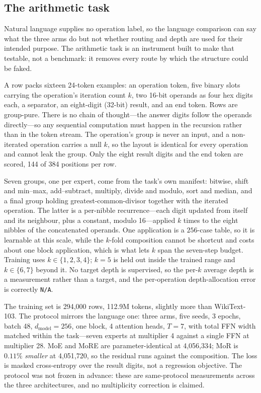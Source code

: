 \subsection{The arithmetic task}
\label{sec:arith-task}

Natural language supplies no operation label, so the language comparison can say
what the three arms do but not whether routing and depth are used for their
intended purpose. The arithmetic task is an instrument built to make that
testable, not a benchmark: it removes every route by which the structure could be
faked.

A row packs sixteen 24-token examples: an operation token, five binary slots
carrying the operation's iteration count $k$, two 16-bit operands as four hex
digits each, a separator, an eight-digit (32-bit) result, and an end token. Rows
are group-pure. There is no chain of thought---the answer digits follow the
operands directly---so any sequential computation must happen in the recursion
rather than in the token stream. The operation's group is never an input, and a
non-iterated operation carries a null $k$, so the layout is identical for every
operation and cannot leak the group. Only the eight result digits and the end
token are scored, 144 of 384 positions per row.

Seven groups, one per expert, come from the task's own manifest: bitwise, shift
and min--max, add--subtract, multiply, divide and modulo, sort and median, and a
final group holding greatest-common-divisor together with the iterated operation.
The latter is a per-nibble recurrence---each digit updated from itself and its
neighbour, plus a constant, modulo 16---applied $k$ times to the eight nibbles of
the concatenated operands. One application is a $256$-case table, so it is
learnable at this scale, while the $k$-fold composition cannot be shortcut and
costs about one block application, which is what lets $k$ span the seven-step
budget. Training uses $k \in \{1,2,3,4\}$; $k = 5$ is held out inside the trained
range and $k \in \{6,7\}$ beyond it. No target depth is supervised, so the per-$k$
average depth is a measurement rather than a target, and the per-operation
depth-allocation error is correctly \texttt{N/A}.

The training set is 294{,}000 rows, 112.9M tokens, slightly more than
WikiText-103. The protocol mirrors the language one: three arms, five seeds,
3 epochs, batch 48, $d_{\text{model}} = 256$, one block, 4 attention heads,
$T = 7$, with total FFN width matched within the task---seven experts at
multiplier 4 against a single FFN at multiplier 28. MoE and MoRE are
parameter-identical at 4{,}056{,}334; MoR is $0.11\%$ \emph{smaller} at
4{,}051{,}720, so the residual runs against the composition. The loss is masked
cross-entropy over the result digits, not a regression objective. The protocol
was not frozen in advance: these are same-protocol measurements across the three
architectures, and no multiplicity correction is claimed.

